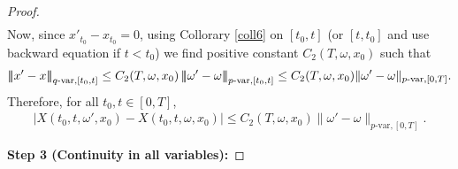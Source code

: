 \documentclass[10pt]{article}
\numberwithin{equation}{section} %
\newcommand{\ltn}{\ensuremath{\left| \! \left| \! \left|}}
\newcommand{\rtn}{\ensuremath{\right| \! \right| \! \right|}}
\begin{document}
\begin{proof}
\begin{eqnarray*}
\end{eqnarray*}
Now, since $x'_{t_0}-x_{t_0}=0$, using Collorary \ref{coll6}  on $[t_0,t]$ (or $[t,t_0]$ and use backward equation if $t<t_0$) we find positive constant $ C_2(T,\omega,x_0)$ such that %
$$
\ltn x'-x\rtn_{q\text{-var},[t_0,t]}\leq C_2(T,\omega,x_0)\ltn\omega'-\omega\rtn_{p\text{-var},[t_0,t]} 
\leq C_2(T,\omega,x_0)\|\omega'-\omega\|_{p\text{-var},[0,T]}.
$$
Therefore, for all $t_0,t\in [0,T]$,
\begin{eqnarray}\label{cont2}
| X(t_0,t,\omega',x_0)-X(t_0,t,\omega,x_0)|\leq C_2(T,\omega,x_0)\|\omega'-\omega\|_{p\text{-var},[0,T]}.
\end{eqnarray}

{\bf Step 3 (Continuity in all variables):} \medskip


\end{proof}
\end{document}
